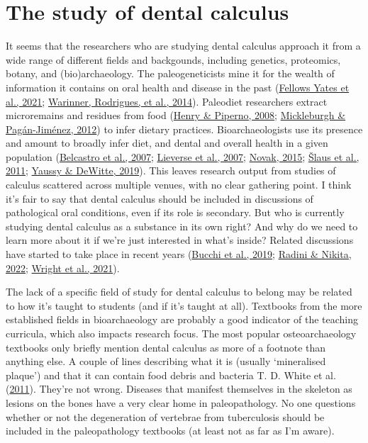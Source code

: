 \documentclass[
  letterpaper,
]{book}
\begin{document}
\hypertarget{intro-study}{%
\section{The study of dental calculus}\label{intro-study}}

It seems that the researchers who are studying dental calculus approach
it from a wide range of different fields and backgounds, including
genetics, proteomics, botany, and (bio)archaeology. The paleogeneticists
mine it for the wealth of information it contains on oral health and
disease in the past
(\protect\hyperlink{ref-yatesOralMicrobiome2021}{Fellows Yates et al.,
2021}; \protect\hyperlink{ref-warinnerPathogensHost2014}{Warinner,
Rodrigues, et al., 2014}). Paleodiet researchers extract microremains
and residues from food
(\protect\hyperlink{ref-henryCalculusSyria2008}{Henry \& Piperno, 2008};
\protect\hyperlink{ref-mickleburghNewInsights2012}{Mickleburgh \&
Pagán-Jiménez, 2012}) to infer dietary practices. Bioarchaeologists use
its presence and amount to broadly infer diet, and dental and overall
health in a given population
(\protect\hyperlink{ref-belcastroContinuityDiscontinuity2007}{Belcastro
et al., 2007}; \protect\hyperlink{ref-lieverseDentalHealth2007}{Lieverse
et al., 2007}; \protect\hyperlink{ref-novakDentalHealth2015}{Novak,
2015}; \protect\hyperlink{ref-slausDentalHealth2011}{Šlaus et al.,
2011}; \protect\hyperlink{ref-yaussyCalculusSurvivorship2019}{Yaussy \&
DeWitte, 2019}). This leaves research output from studies of calculus
scattered across multiple venues, with no clear gathering point. I think
it's fair to say that dental calculus should be included in discussions
of pathological oral conditions, even if its role is secondary. But who
is currently studying dental calculus as a substance in its own right?
And why do we need to learn more about it if we're just interested in
what's inside? Related discussions have started to take place in recent
years (\protect\hyperlink{ref-bucchiComparisonsMethods2019}{Bucchi et
al., 2019}; \protect\hyperlink{ref-radiniDirtyTeeth2022}{Radini \&
Nikita, 2022};
\protect\hyperlink{ref-wrightAdvancingRefining2021}{Wright et al.,
2021}).

The lack of a specific field of study for dental calculus to belong may
be related to how it's taught to students (and if it's taught at all).
Textbooks from the more established fields in bioarchaeology are
probably a good indicator of the teaching curricula, which also impacts
research focus. The most popular osteoarchaeology textbooks only briefly
mention dental calculus as more of a footnote than anything else. A
couple of lines describing what it is (usually `mineralised plaque') and
that it can contain food debris and bacteria T. D. White et al.
(\protect\hyperlink{ref-whiteHumanOsteology2011}{2011}). They're not
wrong. Diseases that manifest themselves in the skeleton as lesions on
the bones have a very clear home in paleopathology. No one questions
whether or not the degeneration of vertebrae from tuberculosis should be
included in the paleopathology textbooks (at least not as far as I'm
aware).
\end{document}
